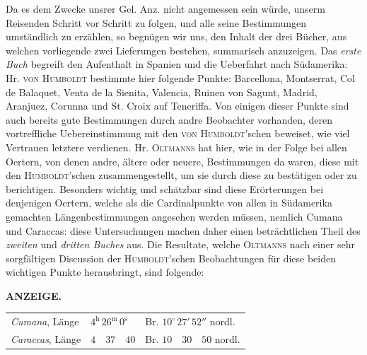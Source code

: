 Da es dem Zwecke unsrer Gel. Anz. nicht angemessen sein würde, unserm Reisenden Schritt vor Schritt zu folgen, und alle seine Bestimmungen umständlich zu erzählen, so begnügen wir uns, den Inhalt der drei Bücher, aus welchen vorliegende zwei Lieferungen bestehen, summarisch anzuzeigen. Das \emph{erste Buch} begreift den Aufenthalt in Spanien und die Ueberfahrt nach Südamerika: Hr. \textsc{von Humboldt} bestimmte hier folgende Punkte: Barcellona, Montserrat, Col de Balaquet, Venta de la Sienita, Valencia, Ruinen von Sagunt, Madrid, Aranjuez, Corunna und St. Croix auf Teneriffa. Von einigen dieser Punkte sind auch bereits gute Bestimmungen durch andre Beobachter vorhanden, deren vortreffliche Uebereinstimmung mit den \textsc{von Humboldt}'schen beweiset, wie viel Vertrauen letztere verdienen. Hr. \textsc{Oltmanns} hat hier, wie in der Folge bei allen Oertern, von denen andre, ältere oder neuere, Bestimmungen da waren, diese mit den \textsc{Humboldt}'schen zusammengestellt, um sie durch diese zu bestätigen oder zu berichtigen. Besonders wichtig und schätzbar sind diese Erörterungen bei denjenigen Oertern, welche als die Cardinalpunkte von allen in Südamerika gemachten Längenbestimmungen angesehen werden müssen, nemlich Cumana und Caraccas: diese Untersuchungen machen daher einen beträchtlichen Theil des \emph{zweiten} und \emph{dritten Buches} aus. Die Resultate, welche \textsc{Oltmanns} nach einer sehr sorgfältigen Discussion der \textsc{Humboldt}'schen Beobachtungen für diese beiden wichtigen Punkte herausbringt, sind folgende:
\par
{}
\thispagestyle{gaussVIGathering104}
\clearpage
\thispagestyle{empty}
\noindent{}%
%
\parbox[t]{\dimexpr\linewidth-24mm\relax}{\centering\footnotesize\bfseries ANZEIGE.\par}%
\makebox[12mm][r]{}\par\nobreak\medskip
\begin{center} \begin{tabular}{@{}lll@{}} \textit{Cumana}, Länge & $4^{\mathrm h}\,26^{\mathrm m}\,0^{\mathrm s}$ & Br. $10^\circ\,27'\,52''$ nordl. \\ \textit{Caraccas}, Länge & $4\quad 37\quad 40$ & Br. $10\quad 30\quad 50$ nordl. \\ \end{tabular} \end{center}
